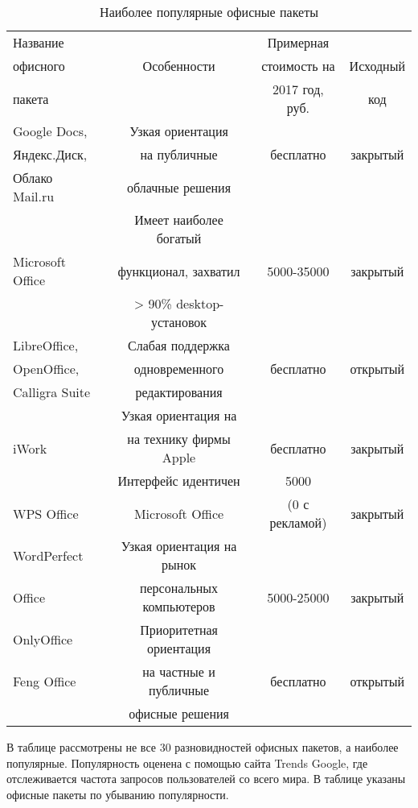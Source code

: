 \begin{table}[!h]
 \begin{tabular}{|l|c|c|c|}
\hline
Название  &   & Примерная  &  \\
офисного  & Особенности &  стоимость на  & Исходный\\
пакета & & 2017 год, руб. &  код  \\
\hline
Google Docs, & Узкая ориентация & &\\
Яндекс.Диск, & на публичные &  бесплатно & закрытый \\
Облако Mail.ru  & облачные решения & & \\
\hline
 &  Имеет наиболее богатый &  &  \\
 Microsoft Office &  функционал, захватил  &  5000-35000&  закрытый\\
 & > 90\% desktop-установок  & & \\
\hline
LibreOffice,& Слабая поддержка & & \\
OpenOffice, & одновременного &  бесплатно & открытый \\
Calligra Suite & редактирования & & \\
\hline
 & Узкая ориентация на & & \\
iWork & на технику фирмы Apple &  бесплатно & закрытый \\
\hline
 & Интерфейс идентичен & 5000 & \\
WPS Office & Microsoft Office &  (0 с рекламой) & закрытый \\
\hline
WordPerfect & Узкая ориентация на рынок&  & \\
Office &  персональных компьютеров & 5000-25000 & закрытый \\

\hline
OnlyOffice & Приоритетная ориентация  & & \\
Feng Office & на частные и публичные &  бесплатно & открытый \\
  & офисные решения & & \\
\hline
 \end{tabular}
\caption{Наиболее популярные офисные пакеты}
\end{table}
В таблице рассмотрены не все 30 разновидностей офисных пакетов, а наиболее популярные. Популярность оценена  с помощью  сайта Trends Google, где отслеживается частота запросов пользователей со всего мира.
В таблице указаны офисные пакеты по убыванию популярности.
